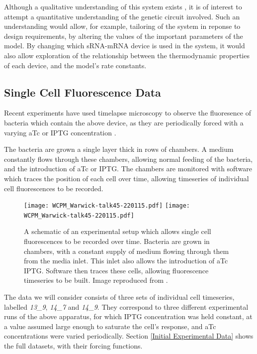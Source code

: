 \documentclass[10pt,journal]{./IEEE_latex_class/IEEEtran}
\begin{document}
Although a qualitative understanding of this system exists \cite{Rodrigo2012}, it is of interest to attempt a quantitative understanding of the genetic circuit involved. Such an understanding would allow, for example, tailoring of the system in reponse to design requirements, by altering the values of the important parameters of the model. By changing which sRNA-mRNA device is used in the system, it would also allow exploration of the relationship between the thermodynamic properties of each device, and the model's rate constants.
 
\subsection{Single Cell Fluorescence Data}

Recent experiments have used timelapse microscopy to observe the fluoresence of bacteria which contain the above device, as they are periodically forced with a varying aTc or IPTG concentration \cite{Jaramillo}. 

The bacteria are grown a single layer thick in rows of chambers. A medium constantly flows through these chambers, allowing normal feeding of the bacteria, and the introduction of aTc or IPTG. The chambers are monitored with software which traces the position of each cell over time, allowing timeseries of individual cell fluorescences to be recorded.

\begin{figure}[H]
\centering
\texttt{[image: WCPM\_Warwick-talk45-220115.pdf]}
\centering
\texttt{[image: WCPM\_Warwick-talk45-220115.pdf]}
\caption{A schematic of an experimental setup which allows single cell fluorescences to be recorded over time. Bacteria are grown in chambers, with a constant supply of medium flowing through them from the media inlet. This inlet also allows the introduction of aTc IPTG. Software then traces these cells, allowing fluorescence timeseries to be built.  Image reproduced from \cite{Jaramillo}.}
\label{reactionscheme}
\end{figure}

The data we will consider consists of three sets of individual cell timeseries, labelled \textit{13\_9}, \textit{14\_7} and \textit{14\_9}. They correspond to three different experimental runs of the above apparatus, for which IPTG concentration was held constant, at a value assumed large enough to saturate the cell's response, and aTc concentrations were varied periodically. Section \ref{Initial  Experimental Data} shows the full datasets, with their forcing functions.
\end{document}
